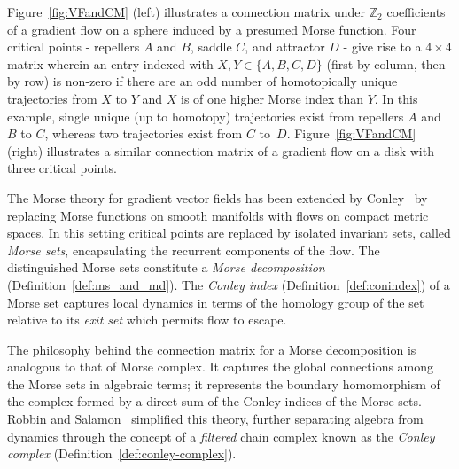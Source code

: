 \documentclass[a4paper,english,cleveref]{article}
\theoremstyle{plain}
\def\mathobj#1{\mbox{$#1$}}
\def\ZZ{\mathobj{\mathbb{Z}}}
\newcounter{li}
\begin{document}
Figure~\ref{fig:VFandCM} (left) illustrates a connection matrix under $\ZZ_2$ coefficients of a gradient flow on a sphere induced by a presumed Morse function. 
Four critical points - repellers $A$ and $B$, saddle $C$, and attractor $D$ - give rise to a $4 \times 4$ matrix wherein an entry indexed with $X,Y \in \{A,B,C,D\}$ (first by column, then by row) is non-zero if there are an odd number of homotopically unique trajectories from $X$ to $Y$ and $X$ is of one higher Morse index than $Y$. 
In this example, single unique (up to homotopy) trajectories exist from repellers $A$ and $B$ to $C$, whereas two trajectories exist from $C$ to~$D$. Figure~\ref{fig:VFandCM} (right) illustrates a similar connection matrix of a gradient flow on a disk with three critical points.

The Morse theory for gradient vector fields has been extended by Conley~\cite{Co78}
by replacing Morse functions on smooth manifolds with flows on compact metric spaces.
In this setting critical points are replaced by isolated invariant sets, called \emph{Morse sets}, encapsulating the recurrent components of the flow.
The distinguished Morse sets constitute a \emph{Morse decomposition} (Definition~\ref{def:ms_and_md}). 
The \emph{Conley index} (Definition~\ref{def:conindex}) of a Morse set captures local dynamics in terms of
the homology group of the set relative to its \textit{exit set} which permits flow to escape.


The philosophy behind the connection matrix for a Morse decomposition is analogous to that of Morse complex.
It captures the global connections among the Morse sets in algebraic terms; it represents the boundary homomorphism of the complex formed by a direct sum of the Conley indices of the Morse sets. 
Robbin and Salamon~\cite{RoSa1992} simplified this theory, further separating algebra from dynamics through the concept of a \emph{filtered} chain complex known as the \emph{Conley complex} (Definition~\ref{def:conley-complex}).
\end{document}
